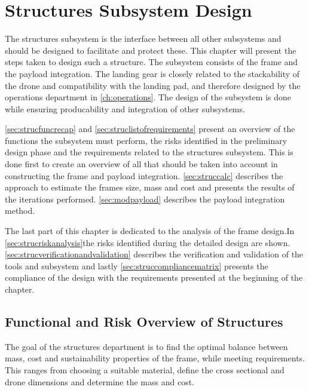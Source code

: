 \chapter{Structures Subsystem Design}
\label{ch:structures}

The structures subsystem is the interface between all other subsystems and should be designed to facilitate and protect these. This chapter will present the steps taken to design such a structure. The subsystem consists of the frame and the payload integration. The landing gear is closely related to the stackability of the drone and compatibility with the landing pad, and therefore designed by the operations department in \autoref{ch:operations}. The design of the subsystem is done while ensuring producability and integration of other subsystems.

\autoref{sec:strucfuncrecap} and \autoref{sec:struclistofrequirements} present an overview of the functions the subsystem must perform, the risks identified in the preliminary design phase \cite{midterm} and the requirements related to the structures subsystem. This is done first to create an overview of all that should be taken into account in constructing the frame and payload integration. \autoref{sec:struccalc} describes the approach to estimate the frames size, mass and cost and presents the results of the iterations performed. \autoref{sec:modpayload} describes the payload integration method.

The last part of this chapter is dedicated to the analysis of the frame design.In \autoref{sec:strucriskanalysis}the risks identified during the detailed design are shown. \autoref{sec:strucverificationandvalidation} describes the verification and validation of the tools and subsystem and lastly \autoref{sec:struccompliancematrix} presents the compliance of the design with the requirements presented at the beginning of the chapter.


% 

\section{Functional and Risk Overview of Structures}
\label{sec:strucfuncrecap}
The goal of the structures department is to find the optimal balance between mass, cost and sustainability properties of the frame, while meeting requirements. This ranges from choosing a suitable material, define the cross sectional and drone dimensions and determine the mass and cost.


